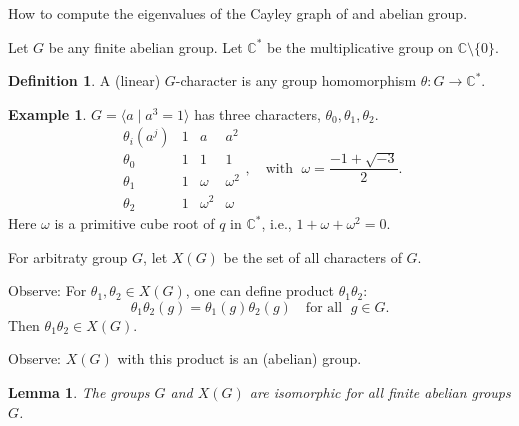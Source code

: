 \documentclass[
]{book}
\newtheorem{lemma}{Lemma}[chapter]
\theoremstyle{definition}
\newtheorem{definition}{Definition}[chapter]
\theoremstyle{definition}
\newtheorem{example}{Example}[chapter]
\theoremstyle{definition}
\theoremstyle{definition}
\theoremstyle{remark}
\begin{document}
How to compute the eigenvalues of the Cayley graph of and abelian group.

Let \(G\) be any finite abelian group. Let \(\mathbb{C}^*\) be the multiplicative group on \(\mathbb{C}\setminus \{0\}\).

\begin{definition}
\protect\hypertarget{def:character}{}\label{def:character}A (linear) \(G\)-character is any group homomorphism \(\theta: G \to \mathbb{C}^*\).
\end{definition}

\begin{example}
\protect\hypertarget{exm:cyclic3}{}\label{exm:cyclic3}\(G = \langle a\mid a^3 =1\rangle\) has three characters, \(\theta_0, \theta_1, \theta_2\).
\[
\begin{array}{c|ccc}
\theta_i(a^j) & 1 & a & a^2 \\
\hline
\theta_0 & 1 & 1 & 1\\
\theta_1 & 1 & \omega & \omega^2\\
\theta_2 & 1 & \omega^2 & \omega
\end{array}, \quad \textrm{with }\; \omega = \frac{-1+\sqrt{-3}}{2}.
\]
Here \(\omega\) is a primitive cube root of \(q\) in \(\mathbb{C}^*\), i.e., \(1+\omega + \omega^2 = 0\).
\end{example}

For arbitraty group \(G\), let \(X(G)\) be the set of all characters of \(G\).

Observe: For \(\theta_1, \theta_2\in X(G)\), one can define product \(\theta_1\theta_2\):
\[\theta_1\theta_2(g) = \theta_1(g)\theta_2(g) \quad \textrm{for all }\; g\in G.\]
Then \(\theta_1\theta_2\in X(G)\).

Observe: \(X(G)\) with this product is an (abelian) group.

\begin{lemma}
\protect\hypertarget{lem:charactergroup}{}\label{lem:charactergroup}The groups \(G\) and \(X(G)\) are isomorphic for all finite abelian groups \(G\).
\end{lemma}
\end{document}
